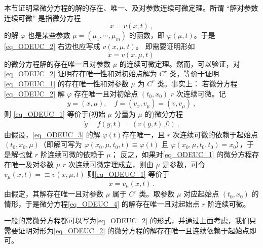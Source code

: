 
本节证明常微分方程的解的存在、唯一、及对参数连续可微定理。所谓 “解对参数连续可微” 是指微分方程
\begin{equation}\label{eq_ODEUC_2}
\dot x=v(x,t)~,
\end{equation}
 的解 $\varphi$ 也是某些参数 $\mu=(\mu_1,\cdots,\mu_m)$ 的函数，即 $\varphi(\mu,t)$。于是 \autoref{eq_ODEUC_2} 右边也应写成 $v(x,\mu,t)$。 即需要证明形如
\begin{equation}\label{eq_ODEUC_1}
\dot x=v(x,\mu,t)~
\end{equation}
的微分方程解的存在唯一且对参数 $\mu$ 的连续可微定理。然而，可以验证，对\autoref{eq_ODEUC_2} 证明存在唯一性和对初始点解为 $C^r$ 类，等价于证明\autoref{eq_ODEUC_1} 的存在唯一性和对参数 $\mu$ 为 $C^r$ 类。事实上：
若微分方程\autoref{eq_ODEUC_2} 解 $\varphi$ 存在唯一且对初始点 $(t_0,x_0)$ $r$ 次连续可微。记 
\begin{equation}
y=(x,\mu),\quad f=(v_x,v_{\mu})=(v,v_{\mu})~,
\end{equation}
则 \autoref{eq_ODEUC_1} 等价于(初始 $\mu$ 分量为 $\mu$ 的)微分方程
\begin{equation}\label{eq_ODEUC_3}
\begin{aligned}
\dot y=f(y,t)=(v(y,t),0)~.
\end{aligned}
\end{equation}
由假设，\autoref{eq_ODEUC_3} 的解 $\varphi(t)$存在唯一，且 $r$ 次连续可微的依赖于起始点 $(t_0,x_0,\mu)$（即解可写为 $\varphi(x_0,\mu,t_0,t)\equiv\varphi(t)$ 且 $\varphi(x_0,\mu,t_0,t_0)=x_0$），于是解也就 $r$ 阶连续可微的依赖于 $\mu$；
反之，如果对\autoref{eq_ODEUC_1} 的微分方程存在唯一及对参数 $\mu$ $r$ 次连续可微定理成立，则由 $\mu$ 是参数，可令 $v_\mu(x,t)=\equiv v(x,\mu,t)$ 则\autoref{eq_ODEUC_1} 等价于
\begin{equation}\label{eq_ODEUC_4} 
\dot x=v_{\mu}(x,t)~.
\end{equation}
由假定，其解存在唯一且对参数 $\mu$ 属于 $C^r$ 类。取参数 $\mu$ 对应起始点 $(t_0,x_0)$ 的情形，于是微分方程\autoref{eq_ODEUC_4} 的解存在唯一且对起始点 $r$ 阶连续可微。

一般的常微分方程都可以写为\autoref{eq_ODEUC_2} 的形式，并通过上面考虑，我们只需要证明对形为\autoref{eq_ODEUC_2} 的微分方程的解存在唯一且连续依赖于起始点即可。

